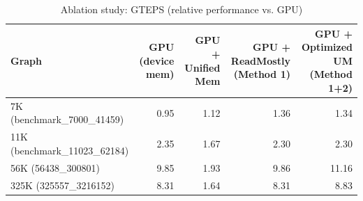\begin{table}[t]
\centering
\caption{Ablation study: GTEPS (relative performance vs. GPU)}
\label{tab:ablation}
\begin{tabular}{lrrrr}
\hline
Graph & GPU (device mem) & GPU + Unified Mem & GPU + ReadMostly (Method 1) & GPU + Optimized UM (Method 1+2) \\
\hline
7K (benchmark_7000_41459) & 0.95 & 1.12 & 1.36 & 1.34 \\
11K (benchmark_11023_62184) & 2.35 & 1.67 & 2.30 & 2.30 \\
56K (56438_300801) & 9.85 & 1.93 & 9.86 & 11.16 \\
325K (325557_3216152) & 8.31 & 1.64 & 8.31 & 8.83 \\
\hline
\end{tabular}
\end{table}
